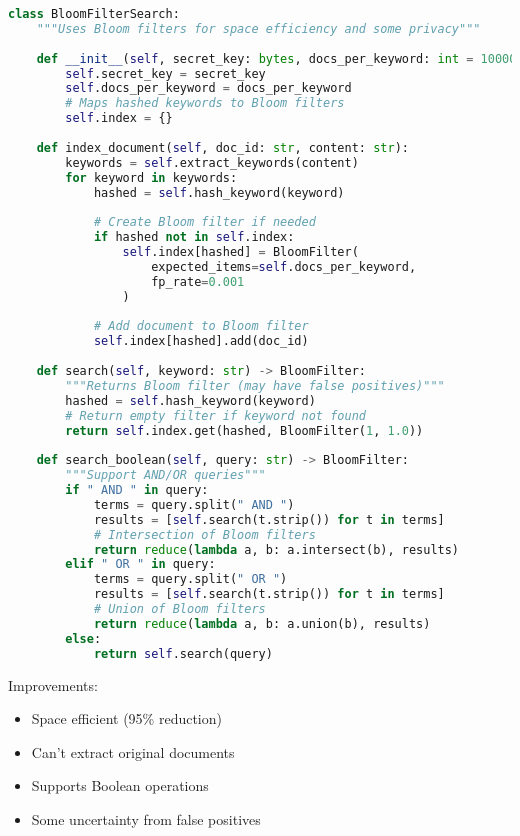 \begin{lstlisting}[language=Python, caption={Bloom filter index - getting closer}]
class BloomFilterSearch:
    """Uses Bloom filters for space efficiency and some privacy"""
    
    def __init__(self, secret_key: bytes, docs_per_keyword: int = 10000):
        self.secret_key = secret_key
        self.docs_per_keyword = docs_per_keyword
        # Maps hashed keywords to Bloom filters
        self.index = {}
    
    def index_document(self, doc_id: str, content: str):
        keywords = self.extract_keywords(content)
        for keyword in keywords:
            hashed = self.hash_keyword(keyword)
            
            # Create Bloom filter if needed
            if hashed not in self.index:
                self.index[hashed] = BloomFilter(
                    expected_items=self.docs_per_keyword,
                    fp_rate=0.001
                )
            
            # Add document to Bloom filter
            self.index[hashed].add(doc_id)
    
    def search(self, keyword: str) -> BloomFilter:
        """Returns Bloom filter (may have false positives)"""
        hashed = self.hash_keyword(keyword)
        # Return empty filter if keyword not found
        return self.index.get(hashed, BloomFilter(1, 1.0))
    
    def search_boolean(self, query: str) -> BloomFilter:
        """Support AND/OR queries"""
        if " AND " in query:
            terms = query.split(" AND ")
            results = [self.search(t.strip()) for t in terms]
            # Intersection of Bloom filters
            return reduce(lambda a, b: a.intersect(b), results)
        elif " OR " in query:
            terms = query.split(" OR ")
            results = [self.search(t.strip()) for t in terms]
            # Union of Bloom filters
            return reduce(lambda a, b: a.union(b), results)
        else:
            return self.search(query)
\end{lstlisting}

Improvements:
\begin{itemize}
\item Space efficient (95\% reduction)
\item Can't extract original documents
\item Supports Boolean operations
\item Some uncertainty from false positives
\end{itemize}

